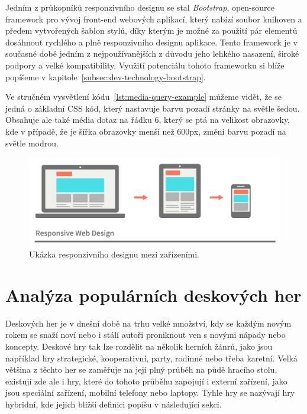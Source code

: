 Jedním z průkopníků responzivního designu se stal \textit{Bootstrap}, open-source framework pro vývoj front-end webových aplikací, který nabízí soubor knihoven a předem vytvořených šablon stylů, díky kterým je možné za použití pár elementů dosáhnout rychlého a plně responzivního designu aplikace. Tento framework je v současné době jedním z nejpoužívanějších z důvodu jeho lehkého nasazení, široké podpory a velké kompatibility. Využití potenciálu tohoto frameworku si blíže popíšeme v kapitole~\ref{subsec:dev-technology-bootstrap}.



Ve stručném vysvětlení kódu~\ref{lst:media-query-example} můžeme vidět, že se jedná o základní CSS kód, který nastavuje barvu pozadí stránky na světle šedou. Obsahuje ale také média dotaz na řádku 6, který se ptá na velikost obrazovky, kde v případě, že je šířka obrazovky menší než 600px, změní barvu pozadí na světle modrou.

\begin{figure}[H]
    \centering
    \includegraphics[width=1.0\textwidth]{figures/responsiveDesign}
    \caption{Ukázka responzivního designu mezi zařízeními. \cite{responsive_design}}
    \label{fig:responsive-design-example}
\end{figure}

\section{Analýza populárních deskových her}
\label{sec:popular-board-games-analysis}
Deskových her je v dnešní době na trhu velké množství, kdy se každým novým rokem se snaží noví nebo i stálí autoři proniknout ven s novými nápady nebo koncepty. Deskové hry tak lze rozdělit na několik herních žánrů, jako jsou například hry strategické, kooperativní, party, rodinné nebo třeba karetní. Velká většina z těchto her se zaměřuje na její plný průběh na půdě hracího stolu, existují zde ale i hry, které do tohoto průběhu zapojují i externí zařízení, jako jsou speciální zařízení, mobilní telefony nebo laptopy. Tyhle hry se nazývají hry hybridní, kde jejich bližší definici popíšu v následující sekci.

